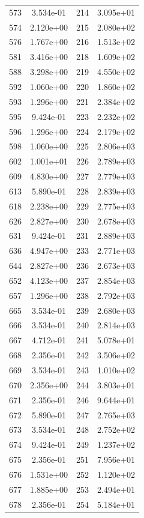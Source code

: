 \documentclass[12pt]{article}
\begin{document}
\begin{longtable}{@{}cccc@{}}
573 & 3.534e-01 & 214 & 3.095e+01 \\
574 & 2.120e+00 & 215 & 2.080e+02 \\
576 & 1.767e+00 & 216 & 1.513e+02 \\
581 & 3.416e+00 & 218 & 1.609e+02 \\
588 & 3.298e+00 & 219 & 4.550e+02 \\
592 & 1.060e+00 & 220 & 1.860e+02 \\
593 & 1.296e+00 & 221 & 2.384e+02 \\
595 & 9.424e-01 & 223 & 2.232e+02 \\
596 & 1.296e+00 & 224 & 2.179e+02 \\
598 & 1.060e+00 & 225 & 2.806e+03 \\
602 & 1.001e+01 & 226 & 2.789e+03 \\
609 & 4.830e+00 & 227 & 2.779e+03 \\
613 & 5.890e-01 & 228 & 2.839e+03 \\
618 & 2.238e+00 & 229 & 2.775e+03 \\
626 & 2.827e+00 & 230 & 2.678e+03 \\
631 & 9.424e-01 & 231 & 2.889e+03 \\
636 & 4.947e+00 & 233 & 2.771e+03 \\
644 & 2.827e+00 & 236 & 2.673e+03 \\
652 & 4.123e+00 & 237 & 2.854e+03 \\
657 & 1.296e+00 & 238 & 2.792e+03 \\
665 & 3.534e-01 & 239 & 2.680e+03 \\
666 & 3.534e-01 & 240 & 2.814e+03 \\
667 & 4.712e-01 & 241 & 5.078e+01 \\
668 & 2.356e-01 & 242 & 3.506e+02 \\
669 & 3.534e-01 & 243 & 1.010e+02 \\
670 & 2.356e+00 & 244 & 3.803e+01 \\
671 & 2.356e-01 & 246 & 9.644e+01 \\
672 & 5.890e-01 & 247 & 2.765e+03 \\
673 & 3.534e-01 & 248 & 2.752e+02 \\
674 & 9.424e-01 & 249 & 1.237e+02 \\
675 & 2.356e-01 & 251 & 7.956e+01 \\
676 & 1.531e+00 & 252 & 1.120e+02 \\
677 & 1.885e+00 & 253 & 2.494e+01 \\
678 & 2.356e-01 & 254 & 5.184e+01 \\

\end{longtable}
\end{document}
